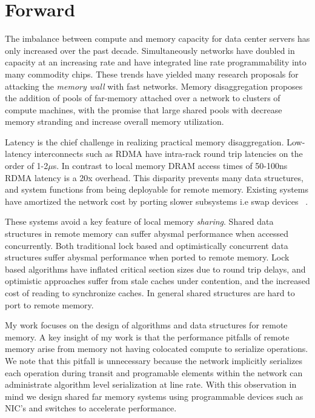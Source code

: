 
\section{Forward}

The imbalance between compute and memory capacity for data
center servers has only increased over the past decade.
Simultaneously networks have doubled in capacity at an
increasing rate and have integrated line rate
programmability into many commodity chips. These trends have
yielded many research proposals for attacking the
\textit{memory wall} with fast networks. Memory
disaggregation proposes the addition of pools of far-memory
attached over a network to clusters of compute machines,
with the promise that large shared pools with decrease
memory stranding and increase overall memory utilization.

Latency is the chief challenge in realizing practical memory
disaggregation. Low-latency interconnects such as RDMA have
intra-rack round trip latencies on the order of 1-2$\mu$s.
In contrast to local memory DRAM access times of 50-100ns
RDMA latency is a 20x overhead. This disparity prevents many
data structures, and system functions from being deployable
for remote memory. Existing systems have amortized the
network cost by porting slower subsystems i.e swap devices
~\cite{fastswap, legoos}. 

These systems avoid a key feature of local memory
\textit{sharing}. Shared data structures in remote memory
can suffer abysmal performance when accessed concurrently.
Both traditional lock based and optimistically concurrent
data structures suffer abysmal performance when ported to
remote memory. Lock based algorithms have inflated critical
section sizes due to round trip delays, and optimistic
approaches suffer from stale caches under contention, and
the increased cost of reading to synchronize caches. In
general shared structures are hard to port to remote memory.

My work focuses on the design of algorithms and data
structures for remote memory.  A key insight of my work is
that the performance pitfalls of remote memory arise from
memory not having colocated compute to serialize operations.
We note that this pitfall is unnecessary because the network
implicitly serializes each operation during transit and
programable elements within the network can administrate
algorithm level serialization at line rate. With this
observation in mind we design shared far memory systems
using programmable devices such as NIC's and switches to
accelerate performance.

